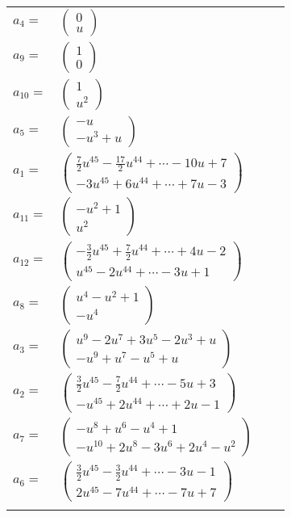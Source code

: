 \documentclass[1p]{elsarticle_modified}
\theoremstyle{definition}
\begin{document}
\begin{tabular}{m{7pt} m{180pt} m{7pt} m{180pt} }
\flushright $a_{4}=$&$\begin{pmatrix}0\\u\end{pmatrix}$ \\
\flushright $a_{9}=$&$\begin{pmatrix}1\\0\end{pmatrix}$ \\
\flushright $a_{10}=$&$\begin{pmatrix}1\\u^2\end{pmatrix}$ \\
\flushright $a_{5}=$&$\begin{pmatrix}- u\\- u^3+u\end{pmatrix}$ \\
\flushright $a_{1}=$&$\begin{pmatrix}\frac{7}{2} u^{45}-\frac{17}{2} u^{44}+\cdots-10 u+7\\-3 u^{45}+6 u^{44}+\cdots+7 u-3\end{pmatrix}$ \\
\flushright $a_{11}=$&$\begin{pmatrix}- u^2+1\\u^2\end{pmatrix}$ \\
\flushright $a_{12}=$&$\begin{pmatrix}-\frac{3}{2} u^{45}+\frac{7}{2} u^{44}+\cdots+4 u-2\\u^{45}-2 u^{44}+\cdots-3 u+1\end{pmatrix}$ \\
\flushright $a_{8}=$&$\begin{pmatrix}u^4- u^2+1\\- u^4\end{pmatrix}$ \\
\flushright $a_{3}=$&$\begin{pmatrix}u^9-2 u^7+3 u^5-2 u^3+u\\- u^9+u^7- u^5+u\end{pmatrix}$ \\
\flushright $a_{2}=$&$\begin{pmatrix}\frac{3}{2} u^{45}-\frac{7}{2} u^{44}+\cdots-5 u+3\\- u^{45}+2 u^{44}+\cdots+2 u-1\end{pmatrix}$ \\
\flushright $a_{7}=$&$\begin{pmatrix}- u^8+u^6- u^4+1\\- u^{10}+2 u^8-3 u^6+2 u^4- u^2\end{pmatrix}$ \\
\flushright $a_{6}=$&$\begin{pmatrix}\frac{3}{2} u^{45}-\frac{3}{2} u^{44}+\cdots-3 u-1\\2 u^{45}-7 u^{44}+\cdots-7 u+7\end{pmatrix}$\\&\end{tabular}
\end{document}
